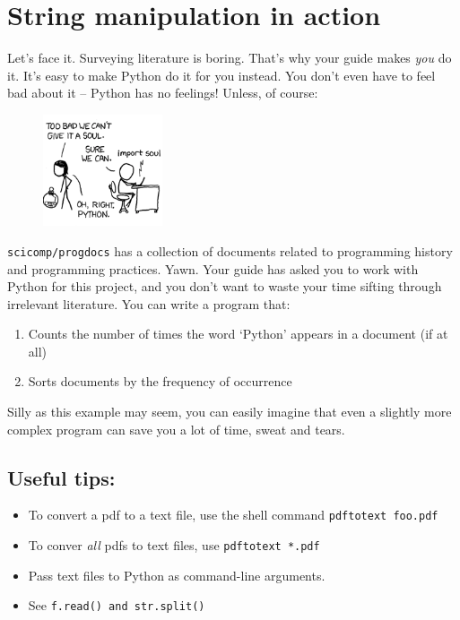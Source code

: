 \documentclass{article}
\begin{document}
\section*{String manipulation in action}
Let's face it. Surveying literature is boring. That's why your guide makes 
\emph{you} do it. It's easy to make Python do it for you instead. You don't even
have to feel bad about it -- Python has no feelings! Unless, of course:
\begin{figure}[h]
\begin{center}
\includegraphics[width=100pt]{../pictures/import_soul.png}
\end{center}
\end{figure}
\newline \texttt{scicomp/progdocs} has a collection of documents related to programming
history and programming practices. Yawn. Your guide has asked you to work
with Python for this project, and you don't want to waste your time sifting through
irrelevant literature. You can write a program that:
\begin{enumerate}
\item Counts the number of times the word `Python' appears in a document (if at all)
\item Sorts documents by the frequency of occurrence
\end {enumerate}
Silly as this example may seem, you can easily imagine that even a slightly
more complex program can save you a lot of time, sweat and tears.
\subsection*{Useful tips:}
\begin{itemize}
\item To convert a pdf to a text file, use the shell command \texttt{pdftotext foo.pdf}
\item To conver \emph{all} pdfs to text files, use \texttt{pdftotext *.pdf}
\item Pass text files to Python as command-line arguments.
\item See \texttt{f.read() and str.split()}
\end{itemize}
\end{document}
